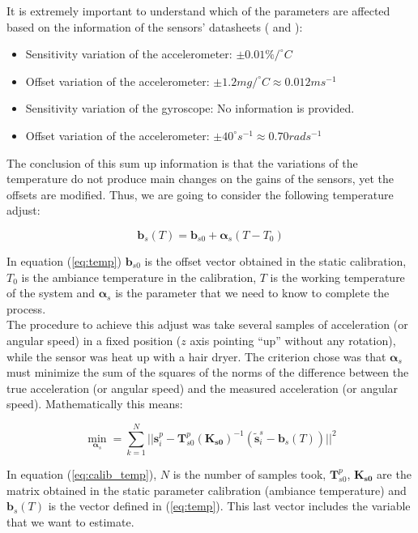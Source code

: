 \documentclass[conference]{IEEEtran}
\newcommand{\refp}[1]{(\ref{#1})}
\begin{document}
It is extremely important to understand which of the parameters are affected based on the information of the sensors' datasheets (\cite{bib:acc_data} and \cite{bib:gyro_data}):

\begin{itemize}
\item Sensitivity variation of the accelerometer: $\pm 0.01 \%/^\circ C$
\item Offset variation of the accelerometer: $\pm 1.2mg/^\circ C \approx 0.012m s^{-1}$
\item Sensitivity variation of the gyroscope: No information is provided. 
\item Offset variation of the accelerometer: $\pm 40 ^\circ s^{-1} \approx 0.70 rad s^{-1}$
\end{itemize}

The conclusion of this sum up information is that the variations of the temperature do not produce main changes on the gains of the sensors, yet the offsets are modified. Thus, we are going to consider the following temperature adjust:

\begin{equation}
\mathbf{b}_s(T) = \mathbf{b}_{s0} + \boldsymbol{\alpha}_s (T-T_0)
\label{eq:temp}
\end{equation}

In equation \refp{eq:temp} $\mathbf{b}_{s0}$ is the offset vector obtained in the static calibration, $T_0$ is the ambiance temperature in the calibration, $T$ is the working temperature of the system and $\boldsymbol{\alpha}_s$ is the parameter that we need to know to complete the process.\\ 

The procedure to achieve this adjust was take several samples of acceleration (or angular speed) in a fixed position ($z$ axis pointing ``up'' without any rotation), while the sensor was heat up with a hair dryer. The criterion chose was that $\boldsymbol{\alpha}_s$ must minimize the sum of the squares of the norms of the difference between the true acceleration (or angular speed) and the measured acceleration (or angular speed). Mathematically this means:

\begin{equation}
\min_{\boldsymbol{\alpha}_s} = \sum_{k=1}^N ||\mathbf{s}_i^p - \mathbf{T}_{s0}^p(\mathbf{K_{s0}})^{-1}(\tilde{\mathbf{s}}_i^s-\mathbf{b}_s(T))||^2 
\label{eq:calib_temp}
\end{equation}

In equation \refp{eq:calib_temp}, $N$ is the number of samples took, $\mathbf{T}_{s0}^p$, $\mathbf{K_{s0}}$ are the matrix obtained in the static parameter calibration (ambiance temperature) and $\mathbf{b}_s(T)$ is the vector defined in \refp{eq:temp}. This last vector includes the variable that we want to estimate.\\
\end{document}
